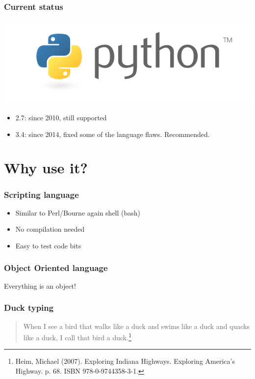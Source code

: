 \documentclass[14pt]{beamer}
\begin{document}
\begin{frame}
\frametitle{Current status}
\includegraphics[width=\textwidth]{python-logo-master-v3-TM.png}

\begin{itemize}
\item 2.7: since 2010, still supported
\item 3.4: since 2014, fixed some of the language flaws. Recommended.
\end{itemize}
\end{frame}

\section{Why use it?}

\begin{frame}
\frametitle{Scripting language}



\begin{itemize}
\item Similar to Perl/Bourne again shell (bash)
\item No compilation needed
\item Easy to test code bits
\end{itemize}
\end{frame}

\begin{frame}
\frametitle{Object Oriented language}
\begin{center}
\alert{Everything is an object!}
\end{center}

\end{frame}

\begin{frame}
\frametitle{Duck typing}
\begin{quote}
When I see a bird that walks like a duck and swims like a duck and quacks like a duck, I call that bird a duck.\footnote{ Heim, Michael (2007). Exploring Indiana Highways. Exploring America's Highway. p. 68. ISBN 978-0-9744358-3-1.}
\end{quote}
\end{frame}
\end{document}
